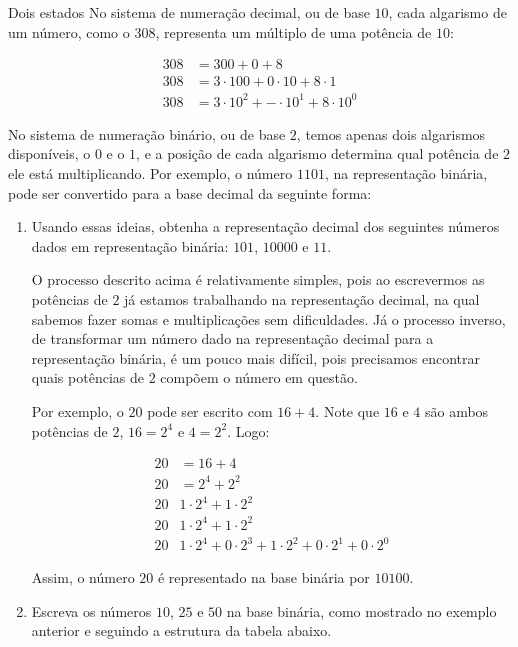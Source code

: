 \clearpage
\begin{task}{Dois estados}
No sistema de numeração decimal, ou de base $10$, cada algarismo de um número, como o $308$, representa um múltiplo de uma potência de $10$:

\begin{align*}
308&=300+0+8\\
308&=3\cdot100+0\cdot10+8\cdot1\\
308&=3\cdot10^2+-\cdot10^1+8\cdot10^0
\end{align*}
 
No sistema de numeração binário, ou de base $2$, temos apenas dois algarismos disponíveis, o $0$ e o $1$, e a posição de cada algarismo determina qual potência de $2$ ele está multiplicando. Por exemplo, o número $1101$, na representação binária, pode ser convertido para a base decimal da seguinte forma:

 
\begin{enumerate}
\item Usando essas ideias, obtenha a representação decimal dos seguintes números dados em representação binária: $101$, $10000$ e $11$.

O processo descrito acima é relativamente simples, pois ao escrevermos as potências de $2$ já estamos trabalhando na representação decimal, na qual sabemos fazer somas e multiplicações sem dificuldades. Já o processo inverso, de transformar um número dado na representação decimal para a representação binária, é um pouco mais difícil, pois precisamos encontrar quais potências de $2$ compõem o número em questão.

Por exemplo, o $20$ pode ser escrito com $16+4$. Note que $16$ e $4$ são ambos potências de $2$, $16=2^4$ e $4=2^2$. Logo:
 
\begin{align*}
20&=16+4\\
20&=2^4+2^2\\
20&1\cdot2^4+1\cdot2^2\\
20&1\cdot2^4+1\cdot2^2\\
20&1\cdot2^4+0\cdot2^3+1\cdot2^2+0\cdot2^1+0\cdot2^0
\end{align*}

Assim, o número $20$ é representado na base binária por $10100$.

\item Escreva os números $10$, $25$ e $50$ na base binária, como mostrado no exemplo anterior e seguindo a estrutura da tabela abaixo.

\begin{table}[H]
\centering


\end{table}
\end{enumerate}
\end{task}
